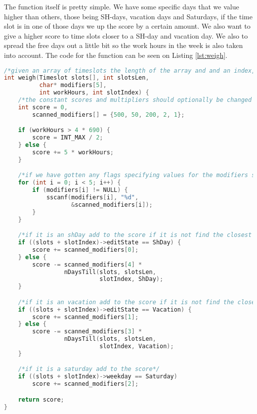 The function itself is pretty simple. We have some specific days that we value higher than others, those being SH-days, vacation days and Saturdays, if the time slot is in one of those days we up the score by a certain amount. We also want to give a higher score to time slots closer to a SH-day and vacation day. We also to spread the free days out a little bit so the work hours in the week is also taken into account. The code for the function can be seen on Listing \ref{lst:weigh}.

\begin{lstlisting}[caption={Weigh function.}, label={lst:weigh}, language=c]
/*given an array of timeslots the length of the array and and an index, return the score of the timeslot of that index*/
int weigh(Timeslot slots[], int slotsLen,
          char* modifiers[5], 
          int workHours, int slotIndex) {
    /*the constant scores and multipliers should optionally be changed by flags*/
    int score = 0, 
        scanned_modifiers[] = {500, 50, 200, 2, 1};

    if (workHours > 4 * 690) {
        score = INT_MAX / 2;
    } else {
        score += 5 * workHours;
    }

    /*if we have gotten any flags specifying values for the modifiers scan them and assign the value*/
    for (int i = 0; i < 5; i++) {
        if (modifiers[i] != NULL) {
            sscanf(modifiers[i], "%d", 
                   &scanned_modifiers[i]); 
        }
    }

    /*if it is an shDay add to the score if it is not find the closest sh day and subtract from the score*/
    if ((slots + slotIndex)->editState == ShDay) {
        score += scanned_modifiers[0];
    } else {
        score -= scanned_modifiers[4] * 
                 nDaysTill(slots, slotsLen, 
                           slotIndex, ShDay);
    }

    /*if it is an vacation add to the score if it is not find the closest vacation and subtract from the score*/
    if ((slots + slotIndex)->editState == Vacation) {
        score += scanned_modifiers[1];
    } else {
        score -= scanned_modifiers[3] *
                 nDaysTill(slots, slotsLen,
                           slotIndex, Vacation);
    }

    /*if it is a saturday add to the score*/
    if ((slots + slotIndex)->weekday == Saturday)
        score += scanned_modifiers[2];

    return score;
}
\end{lstlisting}

